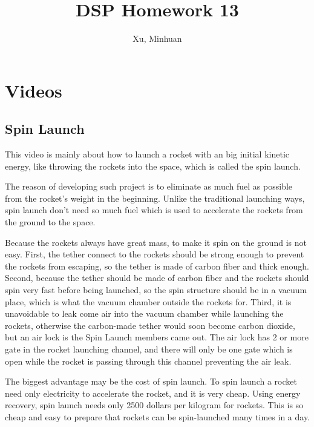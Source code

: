 \documentclass{article}
\begin{document}
\title{DSP Homework 13}
\author{Xu, Minhuan}
\maketitle
\tableofcontents
\begin{abstract}

\end{abstract}

\section{Videos}
\subsection{Spin Launch}
This video is mainly about how to launch a rocket with an big initial kinetic energy, like throwing the rockets into the space, which is called the spin launch.

The reason of developing such project is to eliminate as much fuel as possible from the rocket's weight in the beginning. Unlike the traditional launching ways, spin launch don't need so much fuel which is used to accelerate the rockets from the ground to the space.

Because the rockets always have great mass, to make it spin on the ground is not easy. First, the tether connect to the rockets should be strong enough to prevent the rockets from escaping, so the tether is made of carbon fiber and thick enough. Second, because the tether should be made of carbon fiber and the rockets should spin very fast before being launched, so the spin structure should be in a vacuum place, which is what the vacuum chamber outside the rockets for. Third, it is unavoidable to leak come air into the vacuum chamber while launching the rockets, otherwise the carbon-made tether would soon become carbon dioxide, but an air lock is the Spin Launch members came out. The air lock has 2 or more gate in the rocket launching channel, and there will only be one gate which is open while the rocket is passing through this channel preventing the air leak.

The biggest advantage may be the cost of spin launch. To spin launch a rocket need only electricity to accelerate the rocket, and it is very cheap. Using energy recovery, spin launch needs only 2500 dollars per kilogram for rockets. This is so cheap and easy to prepare that rockets can be spin-launched many times in a day.
\end{document}
